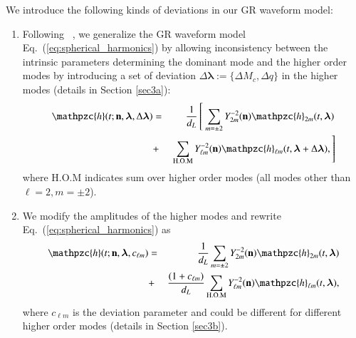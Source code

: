 \documentclass[prd,preprintnumbers,twocolumn,eqsecnum,floatfix,a4paper,nofootinbib,superscriptaddress]{revtex4}
\newcommand{\h}{\mathpzc{h}}
\newcommand{\hlm}{\mathpzc{h}_{\ell m}}
\newcommand{\Ylm}{{Y}^{-2}_{\ell m}}
\newcommand{\blambda}{\bm{\lambda}}
\newcommand{\n}{\mathbf{n}}
\begin{document}

We introduce the following kinds of deviations in our GR waveform model: 

\begin{enumerate}
	\item Following ~\cite{dhanpal2018}, we generalize the GR waveform model Eq.~(\ref{eq:spherical_harmonics}) by allowing inconsistency between the intrinsic parameters determining the dominant mode and the higher order modes by introducing a set of deviation $\Delta \blambda := \{\Delta M_c, \Delta q\}$ in the higher modes (details in Section \ref{sec3a}):
	\begin{eqnarray}
	\h(t; \n, \blambda, \Delta \blambda) & = &  \frac{1}{d_L} \left[ ~ \sum_{m = \pm2} Y^{-2}_{2m} (\n) {\h}_{2m}(t, \blambda) \right. \nonumber \\ 
	& + & \left. \sum _{\text{H.O.M}} \Ylm (\n) \hlm(t, \blambda+\Delta \blambda), \right]
	\label{eq:test_1}
	\end{eqnarray}
where {H.O.M} indicates sum over higher order modes (all modes other than $\ell = 2, m = \pm 2$). 
	
	\item We modify the amplitudes of the higher modes and rewrite Eq.~(\ref{eq:spherical_harmonics}) as
	\begin{eqnarray}
	{\h}(t; \n, \blambda, c_{\ell m}) & = & \frac{1}{d_L} \sum_{m = \pm2} Y^{-2}_{2m} (\n) {\h}_{2m}(t, \blambda)  \nonumber \\ 
	& + & \frac{(1+{c_{\ell m}})}{d_L} \sum _{\text{H.O.M}} \Ylm (\n) \hlm(t, \blambda),
	\label{eq:test_2}
	\end{eqnarray}
	where $c_{\ell m}$ is the deviation parameter and could be different for different higher order modes (details in Section \ref{sec3b}). 
	

\end{enumerate}
\end{document}

